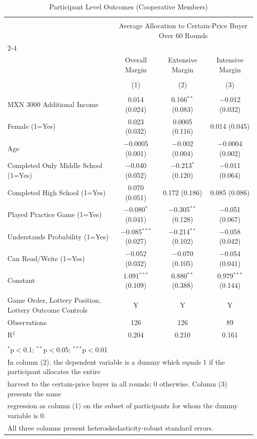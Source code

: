 
\begin{table}[!htbp] \centering 
  \caption{Participant Level Outcomes (Cooperative Members)} 
  \label{participant_level_outcomes_coop} 
\begin{tabular}{@{\extracolsep{5pt}}lccc} 
\\[-1.8ex]\hline 
\hline \\[-1.8ex] 
 & \multicolumn{3}{c}{Average Allocation to Certain-Price Buyer Over 60 Rounds} \\ 
\cline{2-4} 
\\[-1.8ex] & Overall Margin & Extensive Margin & Intensive Margin \\ 
\\[-1.8ex] & (1) & (2) & (3)\\ 
\hline \\[-1.8ex] 
 MXN 3000 Additional Income & 0.014 (0.024) & 0.166$^{**}$ (0.083) & $-$0.012 (0.032) \\ 
  Female (1=Yes) & 0.023 (0.032) & 0.0005 (0.116) & 0.014 (0.045) \\ 
  Age & $-$0.0005 (0.001) & $-$0.002 (0.004) & $-$0.0004 (0.002) \\ 
  Completed Only Middle School (1=Yes) & $-$0.040 (0.052) & $-$0.213$^{*}$ (0.120) & $-$0.011 (0.064) \\ 
  Completed High School (1=Yes) & 0.070 (0.051) & 0.172 (0.186) & 0.085 (0.086) \\ 
  Played Practice Game (1=Yes) & $-$0.080$^{*}$ (0.041) & $-$0.305$^{**}$ (0.128) & $-$0.051 (0.067) \\ 
  Understands Probability (1=Yes) & $-$0.085$^{***}$ (0.027) & $-$0.214$^{**}$ (0.102) & $-$0.058 (0.042) \\ 
  Can Read/Write (1=Yes) & $-$0.052 (0.032) & $-$0.070 (0.105) & $-$0.054 (0.041) \\ 
  Constant & 1.091$^{***}$ (0.109) & 0.880$^{**}$ (0.388) & 0.979$^{***}$ (0.144) \\ 
 \hline \\[-1.8ex] 
Game Order, Lottery Position, Lottery Outcome Controls & Y & Y & Y \\ 
Observations & 126 & 126 & 89 \\ 
R$^{2}$ & 0.204 & 0.210 & 0.161 \\ 
\hline 
\hline \\[-1.8ex] 
\multicolumn{4}{l}{$^{*}$p$<$0.1; $^{**}$p$<$0.05; $^{***}$p$<$0.01} \\ 
\multicolumn{4}{l}{In column (2), the dependent variable is a dummy which equals 1 if the participant allocates the entire} \\ 
\multicolumn{4}{l}{harvest to the certain-price buyer in all rounds; 0 otherwise. Column (3) presents the same} \\ 
\multicolumn{4}{l}{regression as column (1) on the subset of participants for whom the dummy variable is 0.} \\ 
\multicolumn{4}{l}{All three columns present heteroskedasticity-robust standard errors.} \\ 
\end{tabular} 
\end{table} 
